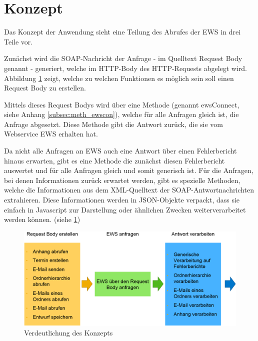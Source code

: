 \section{Konzept}
Das Konzept der Anwendung sieht eine Teilung des Abrufes der \ac{EWS} in drei Teile vor.
 
Zunächst wird die SOAP-Nachricht der Anfrage - im Quelltext Request Body genannt - generiert, welche im HTTP-Body des HTTP-Requests abgelegt wird. Abbildung \ref{fig:abb1} zeigt, welche zu welchen Funktionen es möglich sein soll einen Request Body zu erstellen. 

Mittels dieses Request Bodys wird über eine Methode (genannt ewsConnect, siehe Anhang \ref{subsec:meth_ewscon}), welche für alle Anfragen gleich ist, die Anfrage abgesetzt. Diese Methode gibt die Antwort zurück, die sie vom Webservice \ac{EWS} erhalten hat.

Da nicht alle Anfragen an \ac{EWS} auch eine Antwort über einen Fehlerbericht hinaus erwarten, gibt es eine Methode die zunächst diesen Fehlerbericht auswertet und für alle Anfragen gleich und somit generisch ist. Für die Anfragen, bei denen Informationen zurück erwartet werden, gibt es spezielle Methoden, welche die Informationen aus dem XML-Quelltext der SOAP-Antwortnachrichten extrahieren. Diese Informationen werden in \ac{JSON}-Objekte verpackt, dass sie einfach in Javascript zur Darstellung oder ähnlichen Zwecken weiterverarbeitet werden können. (siehe \ref{fig:abb1})





\begin{figure}[htb]                     \centering 
	\includegraphics[width=1\linewidth]{Abbildungen/Konzept_ews_connect}
	\caption{Verdeutlichung des Konzepts} 
	\label{fig:abb1} 
\end{figure} 

